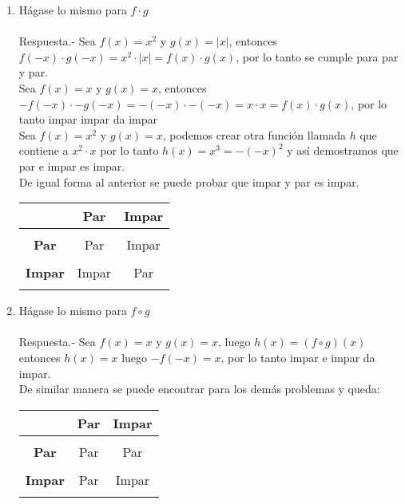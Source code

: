 \begin{enumerate}[\bfseries 1.]
\begin{enumerate}[\bfseries (a)]
	    \item Hágase lo mismo para $f\cdot g$\\\\
	    Respuesta.-\; Sea $f(x)=x^2$ \; y \; $g(x)=|x|$, entonces $f(-x) \cdot g(-x) = x^2 \cdot |x| = f(x) \cdot g(x)$, por lo tanto se cumple para par y par.\\
	    Sea $f(x)=x$ \; y \; $g(x)=x$, entonces $-f(-x) \cdot -g(-x) = -(-x) \cdot -(-x) = x \cdot x = f(x) \cdot g(x)$, por lo tanto impar impar da impar\\
	    Sea $f(x)=x^2$ \; y \; $g(x)=x$, podemos crear otra función llamada $h$ que contiene a $x^2 \cdot x$ por lo tanto $h(x)=x^3 = -(-x)^2$ y así demostramos que par e impar es impar.\\
	    De igual forma al anterior se puede probar que impar y par es impar.
	    \begin{center}
		\begin{tabular}{c|cc}
		    &\textbf{Par}&\textbf{Impar}\\
		    \hline\\
		    \textbf{Par}&Par&Impar\\\\
		    \textbf{Impar}&Impar&Par\\\\
		\end{tabular}
	    \end{center}
	    \vspace{1cm}

	    \item Hágase lo mismo para $f\circ g$\\\\
	    Respuesta.-\; Sea $f(x)=x$ \; y \; $g(x)=x$, luego $h(x)=(f \circ g)(x)$ entonces $h(x) = x$ luego $-f(-x) = x$, por lo tanto impar e impar da impar.\\
	    De similar manera se puede encontrar para los demás problemas y queda:
	    \begin{center}
		\begin{tabular}{c|cc}
		    &\textbf{Par}&\textbf{Impar}\\
		    \hline\\
		    \textbf{Par}&Par&Par\\\\
		    \textbf{Impar}&Par&Impar\\\\
		\end{tabular}
	    \end{center}
	    \vspace{1cm}


\end{enumerate}
\end{enumerate}
